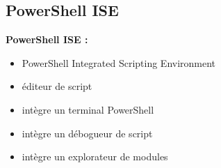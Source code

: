 \documentclass[12pt, a4paper]{article}
\begin{document}
\subsection{PowerShell ISE}
\textbf{PowerShell ISE :}\\

    \begin{itemize}
        \item PowerShell Integrated Scripting Environment
        \item éditeur de script
        \item intègre un terminal PowerShell
        \item intègre un débogueur de script
        \item intègre un explorateur de modules\\
    \end{itemize}
\end{document}
